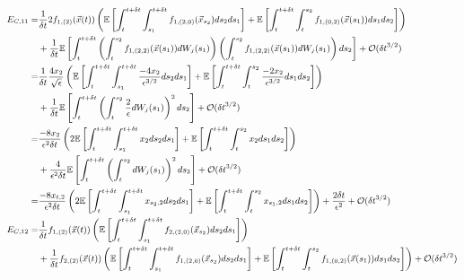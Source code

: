 \documentclass[12pt]{article}
\begin{document}
\begin{equation}
\small
\begin{aligned}
E_{C,11}
=& 
\frac{1}{\delta t} 2 f_{1,(2)}(\vec{x}(t)) \left( \mathbb{E} \left[ \int_t^{t+\delta t} \int_{s_1}^{t+\delta t} f_{1,(2,0)}(\vec{x}_{s_2}) ds_2 ds_1 \right] 
+ \mathbb{E} \left[  \int_t^{t+\delta t} \int_t^{s_2} f_{1,(0,2)}(\vec{x}(s_1)) ds_1 ds_2\right] \right) \\
&+ \frac{1}{\delta t}  \mathbb{E} \left[ \int_t^{t+\delta t}\left( \int_t^{s_2} f_{1,(2,2)}(\vec{x}(s_1)) dW_j(s_1)  \right) \left(  \int_t^{s_2} f_{1,(2,2)}(\vec{x}(s_1)) dW_j(s_1) \right) ds_2 \right] 
+ \mathcal{O} (\delta t^{3/2}) \\
=& 
\frac{1}{\delta t}  \frac{4 x_2}{\sqrt{\epsilon}} \left( \mathbb{E} \left[ \int_t^{t+\delta t} \int_{s_1}^{t+\delta t} \frac{-4 x_2}{\epsilon^{3/2}} ds_2 ds_1 \right] 
+ \mathbb{E} \left[  \int_t^{t+\delta t} \int_t^{s_2} \frac{-2 x_2}{\epsilon^{3/2}} ds_1 ds_2\right] \right) \\
&+ \frac{1}{\delta t} \mathbb{E} \left[ \int_t^{t+\delta t}\left( \int_t^{s_2} \frac{2}{\epsilon} dW_j(s_1)  \right)^2 ds_2 \right] 
+ \mathcal{O} (\delta t^{3/2}) \\
=& 
\frac{-8 x_2}{\epsilon^2 \delta t} \left( 2 \mathbb{E} \left[ \int_t^{t+\delta t} \int_{s_1}^{t+\delta t} x_2 ds_2 ds_1 \right] 
+ \mathbb{E} \left[  \int_t^{t+\delta t} \int_t^{s_2} x_2 ds_1 ds_2\right] \right) \\
&+ \frac{4}{\epsilon^2 \delta t} \mathbb{E} \left[ \int_t^{t+\delta t}\left( \int_t^{s_2} dW_j(s_1)  \right)^2 ds_2 \right] 
+ \mathcal{O} (\delta t^{3/2}) \\
=& 
\frac{-8 x_{t,2}}{\epsilon^2 \delta t} \left( 2 \mathbb{E} \left[ \int_t^{t+\delta t} \int_{s_1}^{t+\delta t} x_{s_2,2} ds_2 ds_1 \right] 
+ \mathbb{E} \left[  \int_t^{t+\delta t} \int_t^{s_2} x_{s_1,2} ds_1 ds_2\right] \right) 
+ \frac{2 \delta t}{\epsilon^2} 
+ \mathcal{O} (\delta t^{3/2}) \\
%
E_{C, 12} 
=& 
\frac{1}{\delta t}  f_{1,(2)}(\vec{x}(t)) \left( \mathbb{E} \left[ \int_t^{t+\delta t} \int_{s_1}^{t+\delta t} f_{2,(2,0)}(\vec{x}_{s_2}) ds_2 ds_1 \right]  \right) \\
&+ \frac{1}{\delta t} f_{2,(2)}(\vec{x}(t)) \left( \mathbb{E} \left[ \int_t^{t+\delta t} \int_{s_1}^{t + \delta t} f_{1,(2,0)}(\vec{x}_{s_2}) ds_2 ds_1 \right]
+ \mathbb{E} \left[ \int_t^{t+\delta t} \int_t^{s_2} f_{1,(0,2)}(\vec{x}(s_1)) ds_1 ds_2 \right] \right) 
+ \mathcal{O} (\delta t^{3/2}) \\

\end{aligned}
\end{equation}
\end{document}
